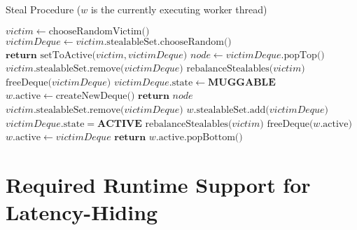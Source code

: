 \documentclass[bsc,frontabs,singlespacing,parskip,deptreport,normalheadings]{infthesis}
\begin{document}
\begin{algorithm}
\caption{Steal Procedure ($w$ is the currently executing worker thread)}\label{alg:steal}
\begin{algorithmic}[1]
            \State $victim \gets \text{chooseRandomVictim()} $
            \State $ victimDeque \gets victim \text{.stealableSet.chooseRandom()} $
                \label{line:choose_random}
                \State $ \textbf{return } \text{setToActive(} victim, victimDeque \text{)}$ 
            \EndIf
            \State $ node \gets victimDeque \text{.popTop()} $
                \State $ victim \text{.stealableSet.remove(} victimDeque \text{)} $
                \State $ \text{rebalanceStealables(} victim \text{)} $
                    \label{line:rebalance_1}
                    \State $ \text{freeDeque(} victimDeque \text{)} $
                \EndIf
                \State $victimDeque\text{.state} \gets \textbf{MUGGABLE}$
            \EndIf
                    \State $w \text{.active} \gets \text{createNewDeque()}$
                \EndIf
                \State $ \textbf{return } node $
            \EndIf
        \EndWhile
    \EndFunction
        \State $ victim \text{.stealableSet.remove(} victimDeque \text{)} $
        \State $ w \text{.stealableSet.add(} victimDeque \text{)} $
        \State $ victimDeque \text{.state} = \textbf{ACTIVE} $
        \State $ \text{rebalanceStealables(} victim \text{)} $
            \label{line:rebalance_2}
            \State $ \text{freeDeque(} w \text{.active)} $
        \EndIf
        \State $ w \text{.active} \gets victimDeque $
        \State $ \textbf{return } w \text{.active.popBottom()} $
    \EndFunction
\end{algorithmic}
\end{algorithm}

\section{Required Runtime Support for Latency-Hiding}
\label{section:required_runtime_support_for_latency_hiding}
\end{document}
